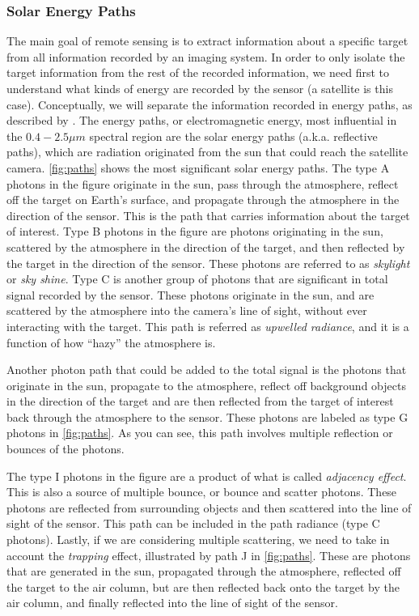 \subsubsection{Solar Energy Paths}
\label{subsubsec:SolarPaths}
The main goal of remote sensing is to extract information about a specific target from all information recorded by an imaging system. In order to only isolate the target information from the rest of the recorded information, we need first to understand what kinds of energy are recorded by the sensor (a satellite is this case). Conceptually, we will separate the information recorded in energy paths, as described by \cite{Schott}. The energy paths, or electromagnetic energy, most influential in the $0.4-2.5\mu m$ spectral region are the solar energy paths (a.k.a. reflective paths), which are radiation originated from the sun that could reach the satellite camera. \autoref{fig:paths} shows the most significant solar energy paths. The type A photons in the figure originate in the sun, pass through the atmosphere, reflect off the target on Earth's surface, and propagate through the atmosphere in the direction of the sensor. This is the path that carries information about the target of interest. Type B photons in the figure are photons originating in the sun, scattered by the atmosphere in the direction of the target, and then reflected by the target in the direction of the sensor. These photons are referred to as {\it skylight} or {\it sky shine}. Type C is another group of photons that are significant in total signal recorded by the sensor. These photons originate in the sun, and are scattered by the atmosphere into the camera's line of sight, without ever interacting with the target. This path is referred as {\it upwelled radiance}, and it is a function of how ``hazy'' the atmosphere is.

Another photon path that could be added to the total signal is the photons that originate in the sun, propagate to the atmosphere, reflect off background objects in the direction of the target and are then reflected from the target of interest back through the atmosphere to the sensor. These photons are labeled as type G photons in \autoref{fig:paths}. As you can see, this path involves multiple reflection or bounces of the photons. 

The type I photons in the figure are a product of what is called {\it adjacency effect}. This is also a source of multiple bounce, or bounce and scatter photons. These photons are reflected from surrounding objects and then scattered into the line of sight of the sensor. This path can be included in the path radiance (type C photons). Lastly, if we are considering multiple scattering, we need to take in account the {\it trapping} effect, illustrated by path J in \autoref{fig:paths}. These are photons that are generated in the sun, propagated through the atmosphere, reflected off the target to the air column, but are then reflected back onto the target by the air column, and finally reflected into the line of sight of the sensor. 

